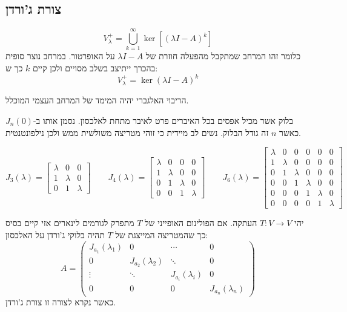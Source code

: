 \documentclass{tstextbook}
\begin{document}
\subsection{צורת ג'ורדן}

\begin{definition}
$$V_\lambda^+ = \bigcup_{k=1}^\infty \ker\left[(\lambda I - A)^k \right] $$
כלומר זהו המרחב שמתקבל מהפעלה חוזרת של \(\lambda I-A\) על האופרטור. במרחב נוצר סופית בהכרך ייתיצב בשלב מסויים ולכן קיים \(k\) כך ש:
$$V_{\lambda}^{+}=\ker \left( \lambda I-A \right)^{k}$$

\end{definition}
\begin{proposition}
הריבוי האלגברי יהיה המימד של המרחב העצמי המוכלל.

\end{proposition}
\begin{definition}
בלוק אשר מכיל אפסים בכל האיברים פרט לאיבר מתחת לאלכסון. נסמן אותו ב-\(J_{n}(0)\) כאשר \(n\) זה גודל הבלוק. נשים לב מיידית כי זוהי מטריצה משולשית ממש ולכן נילפונטנטית.

\end{definition}
\begin{example}
$$J_{3}\left( \lambda \right)= \left[\begin{matrix}\lambda & 0 & 0\\1 & \lambda & 0\\0 & 1 & \lambda\end{matrix}\right]\qquad J_{4}\left( \lambda \right)=\left[\begin{matrix}\lambda & 0 & 0 & 0\\1 & \lambda & 0 & 0\\0 & 1 & \lambda & 0\\0 & 0 & 1 & \lambda\end{matrix}\right]\qquad  J_{6}\left( \lambda \right)=\left[\begin{matrix}\lambda & 0 & 0 & 0 & 0 & 0\\1 & \lambda & 0 & 0 & 0 & 0\\0 & 1 & \lambda & 0 & 0 & 0\\0 & 0 & 1 & \lambda & 0 & 0\\0 & 0 & 0 & 1 & \lambda & 0\\0 & 0 & 0 & 0 & 1 & \lambda\end{matrix}\right]$$

\end{example}
\begin{theorem}[ג'ורדן]
יהי \(T:V\to V\) העתקה. אם הפולינום האופייני של \(T\) מתפרק לגורמים לינארים אזי קיים בסיס כך שהמטריצה המייצגת של \(T\) תהיה בלוקי ג'ורדן על האלכסון:
$$A=\begin{pmatrix}J_{a_{1}}(\lambda_{1})&0&\cdots&0\\ 0&J_{a_{2}}(\lambda_{2})&\ddots&0\\ \vdots&\ddots&J_{a_{i}}(\lambda_{i})&0\\ 0&0&0&J_{a_{n}}(\lambda_{n})\end{pmatrix}$$
כאשר נקרא לצורה זו צורת ג'ורדן.

\end{theorem}
\end{document}
